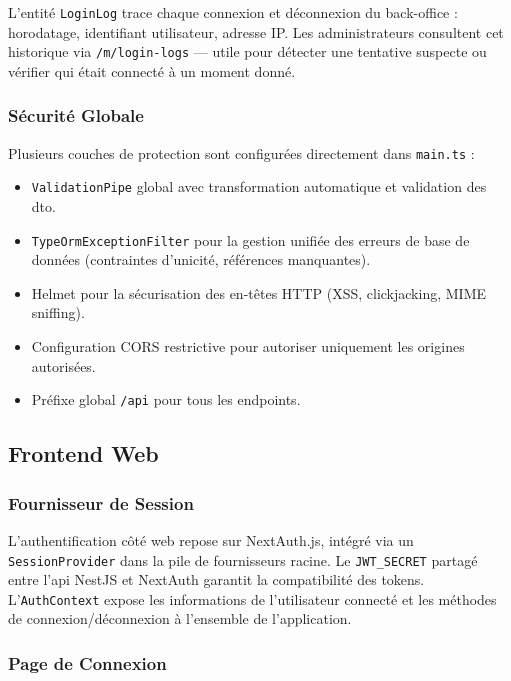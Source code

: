 ﻿\documentclass[../main.tex]{subfiles}
\begin{document}
L'entit\'{e} \texttt{LoginLog} trace chaque connexion et d\'{e}connexion du back-office : horodatage, identifiant utilisateur, adresse IP. Les administrateurs consultent cet historique via \texttt{/m/login-logs} --- utile pour d\'{e}tecter une tentative suspecte ou v\'{e}rifier qui \'{e}tait connect\'{e} \`{a} un moment donn\'{e}.

\subsubsection{S\'{e}curit\'{e} Globale}

Plusieurs couches de protection sont configur\'{e}es directement dans \texttt{main.ts} :

\begin{itemize}
  \item \texttt{ValidationPipe} global avec transformation automatique et validation des \acrshort{dto}.
  \item \texttt{TypeOrmExceptionFilter} pour la gestion unifi\'{e}e des erreurs de base de donn\'{e}es (contraintes d'unicit\'{e}, r\'{e}f\'{e}rences manquantes).
  \item Helmet pour la s\'{e}curisation des en-t\^{e}tes HTTP (XSS, clickjacking, MIME sniffing).
  \item Configuration CORS restrictive pour autoriser uniquement les origines autoris\'{e}es.
  \item Pr\'{e}fixe global \texttt{/api} pour tous les endpoints.
\end{itemize}

\subsection{Frontend Web}

\subsubsection{Fournisseur de Session}

L'authentification c\^{o}t\'{e} web repose sur NextAuth.js, int\'{e}gr\'{e} via un \texttt{SessionProvider} dans la pile de fournisseurs racine. Le \texttt{JWT\_SECRET} partag\'{e} entre l'\acrshort{api} NestJS et NextAuth garantit la compatibilit\'{e} des tokens. L'\texttt{AuthContext} expose les informations de l'utilisateur connect\'{e} et les m\'{e}thodes de connexion/d\'{e}connexion \`{a} l'ensemble de l'application.

\subsubsection{Page de Connexion}
\end{document}
